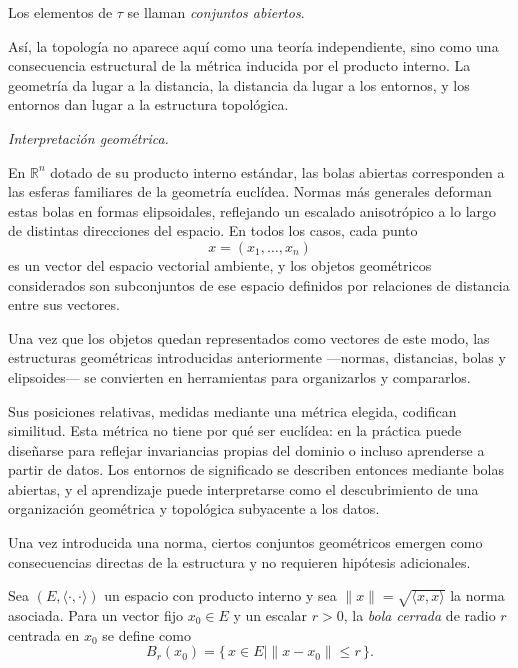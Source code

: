 Los elementos de $\tau$ se llaman \textit{conjuntos abiertos}.

\medskip

Así, la topología no aparece aquí como una teoría independiente, sino como una
consecuencia estructural de la métrica inducida por el producto interno.
La geometría da lugar a la distancia, la distancia da lugar a los entornos,
y los entornos dan lugar a la estructura topológica.

\medskip

\textit{Interpretación geométrica.}

En $\mathbb{R}^n$ dotado de su producto interno estándar, las bolas abiertas
corresponden a las esferas familiares de la geometría euclídea.
Normas más generales deforman estas bolas en formas elipsoidales, reflejando
un escalado anisotrópico a lo largo de distintas direcciones del espacio.
En todos los casos, cada punto
\[
x = (x_1,\dots,x_n)
\]
es un vector del espacio vectorial ambiente, y los objetos geométricos
considerados son subconjuntos de ese espacio definidos por relaciones de
distancia entre sus vectores.

\medskip

Una vez que los objetos quedan representados como vectores de este modo, las
estructuras geométricas introducidas anteriormente ---normas, distancias, bolas
y elipsoides--- se convierten en herramientas para organizarlos y compararlos.

\medskip

Sus posiciones relativas, medidas mediante una métrica elegida, codifican
similitud.
Esta métrica no tiene por qué ser euclídea: en la práctica puede diseñarse
para reflejar invariancias propias del dominio o incluso aprenderse a partir
de datos.
Los entornos de significado se describen entonces mediante bolas abiertas,
y el aprendizaje puede interpretarse como el descubrimiento de una organización
geométrica y topológica subyacente a los datos.

\medskip

Una vez introducida una norma, ciertos conjuntos geométricos emergen como
consecuencias directas de la estructura y no requieren hipótesis adicionales.

\medskip

Sea $(E,\langle\cdot,\cdot\rangle)$ un espacio con producto interno y sea
$\|x\|=\sqrt{\langle x,x\rangle}$ la norma asociada.
Para un vector fijo $x_0\in E$ y un escalar $r>0$, la \emph{bola cerrada}
de radio $r$ centrada en $x_0$ se define como
\[
B_r(x_0)=\{\,x\in E \mid \|x-x_0\|\le r\,\}.
\]


